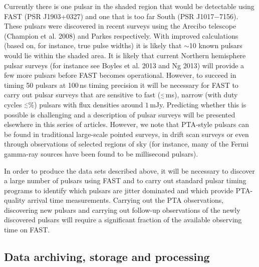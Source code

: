 \documentclass{raa}            %
\def\lapp{\ifmmode\stackrel{<}{_{\sim}}\else$\stackrel{<}{_{\sim}}$\fi}
\begin{document}
 Currently there is one pulsar in the shaded region that would be detectable using FAST (PSR J1903+0327) and one that is too far South (PSR J1017$-$7156). These pulsars were discovered in recent surveys using the Arecibo telescope (Champion et al. 2008\nocite{crl+08}) and Parkes \citep{kjb+12} respectively.  With improved calculations (based on, for instance, true pulse widths) it is likely that $\sim$10 known pulsars would lie within the shaded area.  It is likely that current Northern hemisphere pulsar surveys (for instance see Boyles et al. 2013\nocite{blr+13} and Ng 2013\nocite{ng2013}) will provide a few more pulsars  before FAST becomes operational.  However, to succeed in timing 50 pulsars at 100\,ns timing precision it will be necessary for FAST to carry out pulsar surveys that are sensitive to fast (\lapp3\,ms), narrow (with duty cycles \lapp10\%) pulsars with flux densities around $1$\,mJy.  Predicting whether this is possible is challenging and a description of pulsar surveys will be presented elsewhere in this series of articles. However, we note that PTA-style pulsars can be found in traditional large-scale pointed surveys, in drift scan surveys or even through observations of selected regions of sky (for instance, many of the Fermi gamma-ray sources have been found to be millisecond pulsars). 
  

In order to produce the data sets described above, it will be necessary to discover a large number of pulsars using FAST and to carry out standard pulsar timing programs to identify which pulsars are jitter dominated and which provide PTA-quality arrival time measurements.  Carrying out the PTA observations, discovering new pulsars and carrying out follow-up observations of the newly discovered pulsars will require a significant fraction of the available observing time on FAST.


\subsection{Data archiving, storage and processing}\label{sec:archive}
\end{document}
